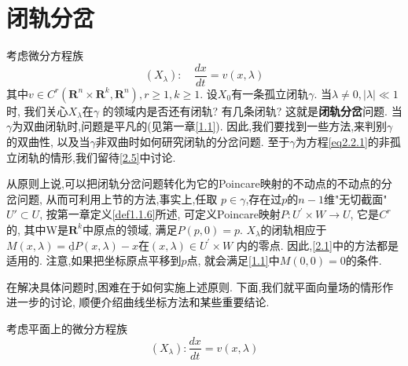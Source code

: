 \section{闭轨分岔}
考虑微分方程族
\begin{equation}
  \left(X_{\lambda}\right) : \quad \frac{d x}{d t}=v(x, \lambda)
  \label{eq2.2.1}
\end{equation}
其中\(v \in C^{r}\left(\mathbf{R}^{n} \times \mathbf{R}^{k}, \mathbf{R}^{n}\right), r \geqslant 1, k \geqslant 1\).
设\(X_{0}\)有一条孤立闭轨\(\gamma\).
当\(\lambda \neq 0,|\lambda| \ll 1\)时,
我们关心\(X_{\lambda}\)在\(\gamma\) 的领域内是否还有闭轨?
有几条闭轨?
这就是\textbf{闭轨分岔}问题.
当\(\gamma\)为双曲闭轨时,问题是平凡的(见第一章\ref{1.1}).
因此,我们要找到一些方法,来判别\(\gamma\)的双曲性,
以及当\(\gamma\)非双曲时如何研究闭轨的分岔问题.
至于\(\gamma\)为方程\eqref{eq2.2.1}的非孤立闭轨的情形,我们留待\ref{2.5}中讨论.
\par
从原则上说,可以把闭轨分岔问题转化为它的Poincare映射的不动点的不动点的分岔问题,
从而可利用上节的方法,事实上,任取
\(p\in \gamma\),存在过\(p\)的\(n-1\)维"无切截面"
\(U' \subset U\),
按第一章定义\ref{def1.1.6}所述,
可定义Poincare映射\(P: U^{\prime} \times W \rightarrow U\),
它是\(C^{r}\)的,
其中W是\(\mathbf{R}^{k}\)中原点的领域,
满足\(P(p, 0)=p\).
\( X_{\lambda}\)的闭轨相应于
\(M(x, \lambda)=\underline{\mathrm{d}}P(x, \lambda)-x
\text{在}
(x, \lambda) \in U^{\prime} \times W
\)
内的零点.
因此,\ref{2.1}中的方法都是适用的.
注意,如果把坐标原点平移到\(p\)点,
就会满足\ref{1.1}中\(M(0,0)=0\)的条件.
\par
在解决具体问题时,困难在于如何实施上述原则.
下面,我们就平面向量场的情形作进一步的讨论,
顺便介绍曲线坐标方法和某些重要结论.
\par
考虑平面上的微分方程族
\begin{equation}
  \label{eq2.2.2}
\left(X_{\lambda}\right):\frac{d x}{d t}=v(x, \lambda)
\end{equation}

